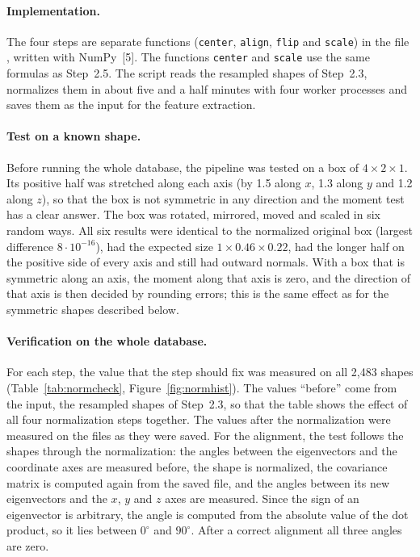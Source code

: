\documentclass[10pt,a4paper]{article}
\begin{document}
\paragraph{Implementation.}
The four steps are separate functions (\texttt{center}, \texttt{align}, \texttt{flip} and \texttt{scale}) in the file
, written with NumPy~[5]. The functions \texttt{center} and \texttt{scale} use the same formulas as
Step~2.5. The script  reads the resampled shapes of Step~2.3, normalizes them in about five and a half
minutes with four worker processes and saves them as the input for the feature extraction.

\paragraph{Test on a known shape.}
Before running the whole database, the pipeline was tested on a box of $4\times2\times1$. Its positive half was stretched along each
axis (by 1.5 along $x$, 1.3 along $y$ and 1.2 along $z$), so that the box is not symmetric in any direction and the moment test has
a clear answer. The box was rotated, mirrored, moved and scaled in six random ways. All six results were identical to the
normalized original box (largest difference $8\cdot10^{-16}$), had the expected size $1\times0.46\times0.22$, had the longer half on
the positive side of every axis and still had outward normals. With a box that is symmetric along an axis, the moment along that axis
is zero, and the direction of that axis is then decided by rounding errors; this is the same effect as for the symmetric shapes
described below.

\paragraph{Verification on the whole database.}
For each step, the value that the step should fix was measured on all 2,483 shapes (Table~\ref{tab:normcheck},
Figure~\ref{fig:normhist}). The values ``before'' come from the input, the resampled shapes of Step~2.3, so that the table
shows the effect of all four normalization steps together. The values after the normalization were measured on the files as
they were saved. For the alignment, the test follows the shapes through the normalization: the angles between the
eigenvectors and the coordinate axes are measured before, the shape is normalized, the covariance matrix is computed again from
the saved file, and the angles between its new eigenvectors and the $x$, $y$ and $z$ axes are measured. Since the sign of an
eigenvector is arbitrary, the angle is computed from the absolute value of the dot product, so it lies between $0^\circ$ and
$90^\circ$. After a correct alignment all three angles are zero.
\end{document}
